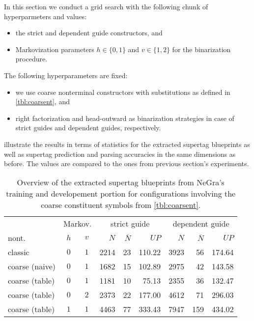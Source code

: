 \documentclass[../../document.tex]{subfiles}
\begin{document}
    In this section we conduct a grid search with the following chunk of hyperparmeters and values:
    \begin{itemize}
        \item the strict and dependent guide constructors, and
        \item Markovization parameters \(h \in \{0,1\}\) and \(v \in \{1,2\}\) for the binarization procedure.
    \end{itemize}
    The following hyperparameters are fixed:
    \begin{itemize}
        \item we use coarse nonterminal constructors with substitutions as defined in \cref{tbl:coarsent}, and
        \item right factorization and head-outward as binarization strategies in case of strict guides and dependent guides, respectively.
    \end{itemize}
     illustrate the results in terms of statistics for the extracted supertag blueprints as well as supertag prediction and parsing accuracies in the same dimensions as before.
    The values are compared to the ones from previous section's experiments.

    \begin{table}
        \caption{\label{tbl:gridsearch:coarse:1}
        Overview of the extracted supertag blueprints from NeGra's training and developement portion for configurations involving the coarse constituent symbols from \cref{tbl:coarsent}.
        }
        \centering
        \vspace{.2cm}
        \begin{tabular}{lcc|rrr|rrr}
            \toprule
& \multicolumn{2}{c|}{Markov.}         & \multicolumn{3}{c|}{strict guide} &  \multicolumn{3}{c}{dependent guide} \\
nont.           & \(h\) & \(v\) & $N$ & $\overline{N}$ & $\mathit{UP}$ & $N$ & $\overline{N}$ & $\mathit{UP}$  \\ \hline \rowcolor{black!10}
classic         & \(0\) & \(1\) & 2214 & 23 & 110.22 & 3923 & 56 & 174.64\\ \rowcolor{black!10}
coarse (naive)  & \(0\) & \(1\) & 1682 & 15 & 102.89 & 2975 & 42 & 143.58\\\hline
coarse (table)  & \(0\) & \(1\) & 1181 & 10 & 75.13 & 2355 & 36 & 132.47 \\
coarse (table)  & \(0\) & \(2\) & 2373 & 22 & 177.00 & 4612 & 71 & 296.03 \\
coarse (table)  & \(1\) & \(1\) & 4463 & 77 & 333.43 & 7947 & 159 & 434.02 \\
\bottomrule
        \end{tabular}
    \end{table}
\end{document}
